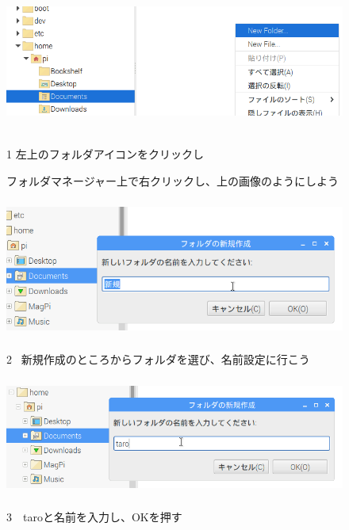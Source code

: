 \documentclass[a4paper,12pt]{jarticle}
\begin{document}
\begin{figure}[ht]
  \vspace{8mm}\\
  \centering
  \includegraphics[width=13.33cm,height=4.74cm]{textbook-img034.png}
  \begin{minipage}{\textwidth}
    1
    左上のフォルダアイコンをクリックし

    フォルダマネージャー上で右クリックし、上の画像のようにしよう
  \end{minipage}

  \centering
  \includegraphics[width=12.483cm,height=4.584cm]{textbook-img036.png}
  \begin{minipage}{\textwidth}
    2
    \ 新規作成のところからフォルダを選び、名前設定に行こう
  \end{minipage}

  \centering
  \includegraphics[width=12.776cm,height=3.879cm]{textbook-img039.png}
  \begin{minipage}{\textwidth}
    3　taroと名前を入力し、OKを押す
  \end{minipage}


\end{figure}
\end{document}
